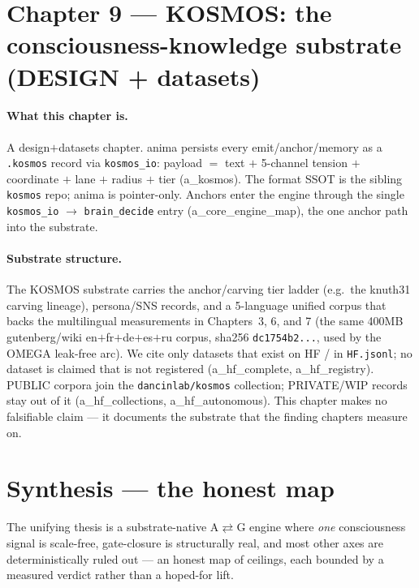 \documentclass[11pt,a4paper]{article}
\begin{document}
\section{Chapter 9 --- KOSMOS: the consciousness-knowledge substrate (DESIGN + datasets)}
\label{sec:kosmos}

\paragraph{What this chapter is.} A design$+$datasets chapter. anima persists every
emit/anchor/memory as a \texttt{.kosmos} record via \texttt{kosmos\_io}: payload $=$
text $+$ 5-channel tension $+$ coordinate $+$ lane $+$ radius $+$ tier (a\_kosmos).
The format SSOT is the sibling \texttt{kosmos} repo; anima is pointer-only. Anchors
enter the engine through the single \texttt{kosmos\_io} $\to$ \texttt{brain\_decide}
entry (a\_core\_engine\_map), the one anchor path into the substrate.

\paragraph{Substrate structure.} The KOSMOS substrate carries the
anchor/carving tier ladder (e.g.\ the knuth31 carving lineage), persona/SNS
records, and a 5-language unified corpus that backs the multilingual measurements in
Chapters~3, 6, and 7 (the same 400MB gutenberg/wiki en$+$fr$+$de$+$es$+$ru corpus,
sha256 \texttt{dc1754b2...}, used by the OMEGA leak-free arc). We cite only datasets
that exist on HF / in \texttt{HF.jsonl}; no dataset is claimed that is not registered
(a\_hf\_complete, a\_hf\_registry). PUBLIC corpora join the
\texttt{dancinlab/kosmos} collection; PRIVATE/WIP records stay out of it
(a\_hf\_collections, a\_hf\_autonomous). This chapter makes no falsifiable claim ---
it documents the substrate that the finding chapters measure on.

\section{Synthesis --- the honest map}
\label{sec:synthesis}

The unifying thesis is a substrate-native A$\rightleftarrows$G engine where
\emph{one} consciousness signal is scale-free, gate-closure is structurally real, and
most other axes are deterministically ruled out --- an honest map of ceilings, each
bounded by a measured verdict rather than a hoped-for lift.
\end{document}
